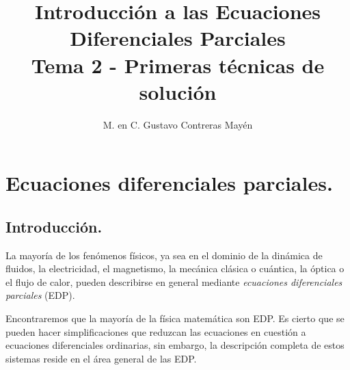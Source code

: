 
\title{Introducción a las Ecuaciones Diferenciales Parciales \\[0.3em]  \large{Tema 2 - Primeras técnicas de solución} \vspace{-3ex}}
\author{M. en C. Gustavo Contreras Mayén}
\date{ }

\pagestyle{fancy}
\fancyhf{}
\lhead{\leftmark}
\rfoot{\thepage}
\setlength{\headheight}{16pt}%


\vspace{-4cm}
\maketitle
\fontsize{14}{14}\selectfont
\tableofcontents
\newpage

\section{Ecuaciones diferenciales parciales.}

\subsection{Introducción.}

La mayoría de los fenómenos físicos, ya sea en el dominio de la dinámica de fluidos, la electricidad, el magnetismo, la mecánica clásica o cuántica, la óptica o el flujo de calor, pueden describirse en general mediante \emph{ecuaciones diferenciales parciales} (EDP).
\par
Encontraremos que la mayoría de la física matemática son EDP. Es cierto que se pueden hacer simplificaciones que reduzcan las ecuaciones en cuestión a ecuaciones diferenciales ordinarias, sin embargo, la descripción completa de estos sistemas reside en el área general de las EDP.
